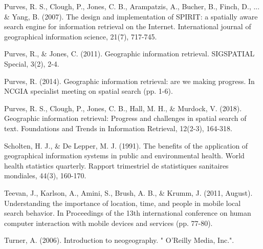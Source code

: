 \documentclass{llncs}
\begin{document}
\begin{thebibliography}{}
Purves, R. S., Clough, P., Jones, C. B., Arampatzis, A., Bucher, B.,
Finch, D., ... \& Yang, B. (2007). The design and implementation of SPIRIT: a
spatially aware search engine for information retrieval on the Internet.
International journal of geographical information science, 21(7), 717-745.

Purves, R., \& Jones, C. (2011). Geographic information retrieval. SIGSPATIAL
Special, 3(2), 2-4.

Purves, R. (2014). Geographic information retrieval: are we making progress. In
NCGIA specialist meeting on spatial search (pp. 1-6).

Purves, R. S., Clough, P., Jones, C. B., Hall, M. H., \& Murdock, V. (2018).
Geographic information retrieval: Progress and challenges in spatial search of
text. Foundations and Trends in Information Retrieval, 12(2-3), 164-318.

Scholten, H. J., \& De Lepper, M. J. (1991). The benefits of the application of
geographical information systems in public and environmental health. World
health statistics quarterly. Rapport trimestriel de statistiques sanitaires
mondiales, 44(3), 160-170.

Teevan, J., Karlson, A., Amini, S., Brush, A. B., \& Krumm, J. (2011, August).
Understanding the importance of location, time, and people in mobile local
search behavior. In Proceedings of the 13th international conference on human
computer interaction with mobile devices and services (pp. 77-80).

Turner, A. (2006). Introduction to neogeography. " O'Reilly Media, Inc.".

\end{thebibliography}

\clearpage
{} %
\renewcommand{\indexname}{Subject Index}

\end{document}
